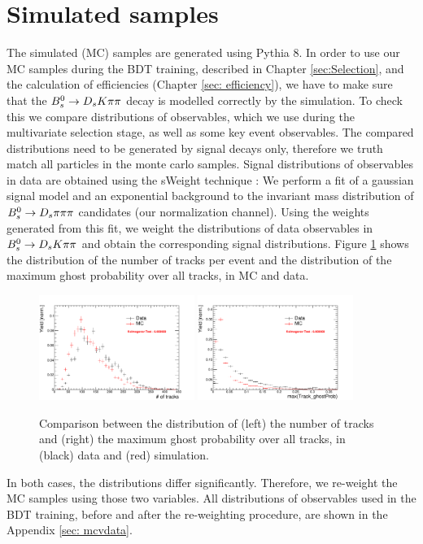 \section{Simulated samples}

The simulated (MC) samples are generated using Pythia 8. \newline
In order to use our MC samples during the BDT training, described in Chapter \ref{sec:Selection}, and the calculation of efficiencies (Chapter \ref{sec: efficiency}), 
we have to make sure that the ${{B}^0_{s}}\rightarrow{\ensuremath{{D}_{s}}}{\ensuremath{K}}{\ensuremath{\pi}}{\ensuremath{\pi}}$ decay is modelled correctly by the simulation. 
To check this we compare distributions of observables, which we use during the multivariate selection stage, as well as some key event observables. 
The compared distributions need to be generated by signal decays only, therefore we truth match all particles in the monte carlo samples. 
Signal distributions of observables in data are obtained using the sWeight technique \cite{Pivk:2004ty}: 
We perform a fit of a gaussian signal model and an exponential background to the invariant mass distribution of ${{B}^0_{s}}\rightarrow{\ensuremath{{D}_{s}}}{\ensuremath{\pi}}{\ensuremath{\pi}}{\ensuremath{\pi}}$ candidates (our normalization channel). 
Using the weights generated from this fit, we weight the distributions of data observables in ${{B}^0_{s}}\rightarrow{\ensuremath{{D}_{s}}}{\ensuremath{K}}{\ensuremath{\pi}}{\ensuremath{\pi}}$ and obtain the corresponding signal distributions. \newline
Figure \ref{fig: MCbeforeWeighting} shows the distribution of the number of tracks per event and the distribution of the maximum ghost probability over all tracks, in MC and data.

\begin{figure}[h]
\includegraphics[height=6.cm,width=0.45\textwidth]{figs/nTracks.pdf}
\includegraphics[height=6.cm,width=0.45\textwidth]{figs/max_ghostProb.pdf}
\caption{Comparison between the distribution of (left) the number of tracks and (right) the maximum ghost probability over all tracks, in (black) data and (red) simulation.}
\label{fig: MCbeforeWeighting}
\end{figure}


In both cases, the distributions differ significantly. Therefore, we re-weight the MC samples using those two variables. 
All distributions of observables used in the BDT training, before and after the re-weighting procedure, are shown in the Appendix \ref{sec: mcvdata}.                 

